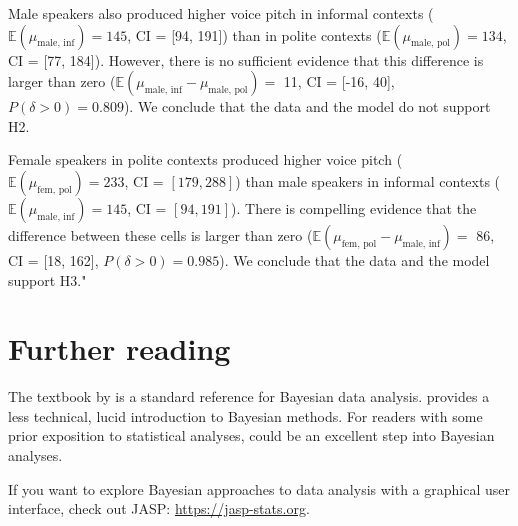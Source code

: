 \documentclass[nobib]{tufte-handout}
\begin{document}
Male speakers also produced higher voice pitch in informal contexts
($\mathbb{E}(\mu_{\text{male, inf}}) = 145$, CI = [94, 191]) than in polite contexts
($\mathbb{E}(\mu_{\text{male, pol}}) = 134$, CI = [77, 184]). However, there is no sufficient
evidence that this difference is larger than zero ($\mathbb{E}(\mu_{\text{male, inf}} - \mu_{\text{male, pol}}) =$ 11, CI =
[-16, 40], $P(\delta > 0) = 0.809$). We conclude that the data and the model do not
support H2.

Female speakers in polite contexts produced higher voice pitch ($\mathbb{E}(\mu_{\text{fem,
    pol}}) = 233$, CI = $[179, 288]$) than male speakers in informal contexts
($\mathbb{E}(\mu_{\text{male, inf}}) = 145$, CI = $[94, 191]$). There is compelling
evidence that the difference between these cells is larger than zero ($\mathbb{E}(\mu_{\text{fem,
    pol}} - \mu_{\text{male, inf}}) = $ 86, CI = [18, 162], $P(\delta >
0) = 0.985$). We conclude that the data and the model support H3."


\section{Further reading}

The textbook by \citet{GelmanCarlin2014:Bayesian-Data-A} is a standard reference for Bayesian
data analysis. \citet{Kruschke2011:Doing-Bayesian-} provides a less technical, lucid
introduction to Bayesian methods. For readers with some prior exposition to statistical
analyses, \citet{McElreath2016:Statistical-Ret} could be an excellent step into Bayesian
analyses.

If you want to explore Bayesian approaches to data analysis with a graphical user interface,
check out JASP: \url{https://jasp-stats.org}.







\printbibliography[heading=bibintoc]
\end{document}
